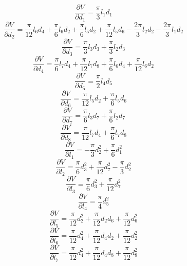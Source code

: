\documentclass[letter,11pt]{article}
\begin{document}
\begin{equation}
    \frac{\partial{V}}{\partial{d_1}}=\frac{\pi}{3}l_1 d_1
\end{equation}
\begin{equation}
    \frac{\partial{V}}{\partial{d_2}}=\frac{\pi}{12}l_6 d_4
    +\frac{\pi}{6}l_6 d_2+\frac{\pi}{6}l_5 d_2+\frac{\pi}{12}l_5 d_6
    -\frac{2\pi}{3}l_2 d_2-\frac{2\pi}{3}l_1 d_2
\end{equation}
\begin{equation}
    \frac{\partial{V}}{\partial{d_3}}=\frac{\pi}{3}l_3 d_3+\frac{\pi}{3}l_2 d_3
\end{equation}
\begin{equation}
    \frac{\partial{V}}{\partial{d_4}}=\frac{\pi}{6}l_7 d_4
    +\frac{\pi}{12}l_7 d_8+\frac{\pi}{6}l_6 d_4+\frac{\pi}{12}l_6 d_2
\end{equation}
\begin{equation}
    \frac{\partial{V}}{\partial{d_5}}=\frac{\pi}{2}l_4 d_5
\end{equation}
\begin{equation}
    \frac{\partial{V}}{\partial{d_6}}=\frac{\pi}{12}l_5 d_2+\frac{\pi}{6}l_5 d_6
\end{equation}
\begin{equation}
    \frac{\partial{V}}{\partial{d_7}}=\frac{\pi}{6}l_3 d_7+\frac{\pi}{6}l_2 d_7
\end{equation}
\begin{equation}
    \frac{\partial{V}}{\partial{d_8}}=\frac{\pi}{12}l_7 d_4+\frac{\pi}{6}l_7 d_8
\end{equation}
\begin{equation}
    \frac{\partial{V}}{\partial{l_1}}=-\frac{\pi}{3}d_2^2+\frac{\pi}{6}d_1^2
\end{equation}
\begin{equation}
    \frac{\partial{V}}{\partial{l_2}}=\frac{\pi}{6}d_3^2+\frac{\pi}{12}d_7^2
    -\frac{\pi}{3}d_2^2
\end{equation}
\begin{equation}
    \frac{\partial{V}}{\partial{l_3}}=\frac{\pi}{6}d_3^2+\frac{\pi}{12}d_7^2
\end{equation}
\begin{equation}
    \frac{\partial{V}}{\partial{l_4}}=\frac{\pi}{4}d_5^2
\end{equation}
\begin{equation}
    \frac{\partial{V}}{\partial{l_5}}=\frac{\pi}{12}d_2^2+\frac{\pi}{12}d_2 d_6
    +\frac{\pi}{12}d_6^2
\end{equation}
\begin{equation}
    \frac{\partial{V}}{\partial{l_6}}=\frac{\pi}{12}d_4^2+\frac{\pi}{12}d_4 d_2
    +\frac{\pi}{12}d_2^2
\end{equation}
\begin{equation}
    \frac{\partial{V}}{\partial{l_7}}=\frac{\pi}{12}d_4^2+\frac{\pi}{12}d_4 d_8
    +\frac{\pi}{12}d_8^2
\end{equation}
\end{document}
